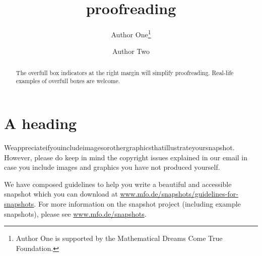 \documentclass{snapshotmfo}
\author{Author One\thanks{Author One is supported by the Mathematical Dreams Come True Foundation.} \and Author Two}
\title{proofreading}
\begin{document}

\begin{abstract}
The overfull box indicators at the right margin will simplify proofreading. Real-life examples of overfull boxes
are welcome.
\end{abstract}

\section{A heading}
Weappreciateifyouincludeimagesorothergraphicsthatillustrateyoursnapshot. However, please do keep in mind the copyright issues explained in our email in case you include images and graphics you have not produced yourself.

We have composed guidelines to help you write a beautiful and accessible snapshot which you can download at \href{http://www.mfo.de/snapshots/guidelines-for-snapshots}{\hbox{www.mfo.de/snapshots/guidelines-for-snapshots}}. For more information on the snapshot project (including example snapshots), please see \href{http://www.mfo.de/snapshots}{www.mfo.de/snapshots}.
\end{document}
